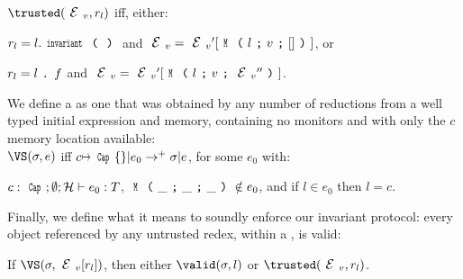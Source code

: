 \indent $\trusted(\EV,r_l)$ iff, either:
\begin{iitemize}
\item $r_l=l.\invariant$ and
$\EV=\EV'[\M{l}{v}{\square}]$, or
\item $r_l=l{ \mbox{ {\texttt{.}} } } f$ and
$\EV=\EV'[\M{l}{v}{\EV''}]$.
\end{iitemize}

\noindent We define a \VS as one that was obtained by any number of reductions from a well typed initial expression and memory, containing no monitors and with only the $c$ memory location available:\\
\indent $\VS(\s, e)$ iff $c\mapsto\Kw{Cap}\{\}|e_0\rightarrow^+ \s|e$, for some $e_0$ with:
\begin{iitemize}
\item[] $c:\Kw{Cap};\emptyset; \h \vdash e_0: 	T$, $\M{\_}{\_}{\_} \notin e_0$, and if $l \in e_0$ then $l = c$.
\end{iitemize}

\noindent Finally, we define what it means to soundly enforce our invariant protocol: every object referenced by any untrusted redex, within a \VS, is valid:%
\SS\begin{theorem}[Soundness]\rm
If $\VS(\s, \EV[r_l])$, then either $\valid(\s,l)$ or $\trusted(\EV,r_l)$.
\end{theorem}

